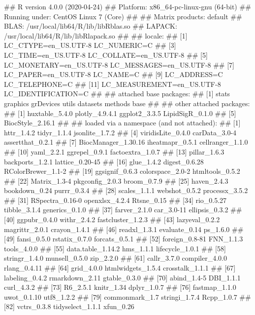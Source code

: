 \documentclass[]{article}
\renewenvironment{verbatim}{\color{codecolor}\begin{myshaded}\begin{oldverbatim}}{\end{oldverbatim}\end{myshaded}}
\begin{document}
\begin{verbatim}
## R version 4.0.0 (2020-04-24)
## Platform: x86_64-pc-linux-gnu (64-bit)
## Running under: CentOS Linux 7 (Core)
##
## Matrix products: default
## BLAS:   /usr/local/lib64/R/lib/libRblas.so
## LAPACK: /usr/local/lib64/R/lib/libRlapack.so
##
## locale:
##  [1] LC_CTYPE=en_US.UTF-8       LC_NUMERIC=C
##  [3] LC_TIME=en_US.UTF-8        LC_COLLATE=en_US.UTF-8
##  [5] LC_MONETARY=en_US.UTF-8    LC_MESSAGES=en_US.UTF-8
##  [7] LC_PAPER=en_US.UTF-8       LC_NAME=C
##  [9] LC_ADDRESS=C               LC_TELEPHONE=C
## [11] LC_MEASUREMENT=en_US.UTF-8 LC_IDENTIFICATION=C
##
## attached base packages:
## [1] stats     graphics  grDevices utils     datasets  methods   base
##
## other attached packages:
## [1] huxtable_5.4.0   plotly_4.9.4.1   ggplot2_3.3.5    LipidSigR_0.1.0
## [5] BiocStyle_2.16.1
##
## loaded via a namespace (and not attached):
##  [1] httr_1.4.2          tidyr_1.1.4         jsonlite_1.7.2
##  [4] viridisLite_0.4.0   carData_3.0-4       assertthat_0.2.1
##  [7] BiocManager_1.30.16 iheatmapr_0.5.1     cellranger_1.1.0
## [10] yaml_2.2.1          ggrepel_0.9.1       factoextra_1.0.7
## [13] pillar_1.6.3        backports_1.2.1     lattice_0.20-45
## [16] glue_1.4.2          digest_0.6.28       RColorBrewer_1.1-2
## [19] ggsignif_0.6.3      colorspace_2.0-2    htmltools_0.5.2
## [22] Matrix_1.3-4        pkgconfig_2.0.3     broom_0.7.9
## [25] haven_2.4.3         bookdown_0.24       purrr_0.3.4
## [28] scales_1.1.1        webshot_0.5.2       processx_3.5.2
## [31] RSpectra_0.16-0     openxlsx_4.2.4      Rtsne_0.15
## [34] rio_0.5.27          tibble_3.1.4        generics_0.1.0
## [37] farver_2.1.0        car_3.0-11          ellipsis_0.3.2
## [40] ggpubr_0.4.0        withr_2.4.2         fastcluster_1.2.3
## [43] lazyeval_0.2.2      magrittr_2.0.1      crayon_1.4.1
## [46] readxl_1.3.1        evaluate_0.14       ps_1.6.0
## [49] fansi_0.5.0         rstatix_0.7.0       forcats_0.5.1
## [52] foreign_0.8-81      FNN_1.1.3           tools_4.0.0
## [55] data.table_1.14.2   hms_1.1.1           lifecycle_1.0.1
## [58] stringr_1.4.0       munsell_0.5.0       zip_2.2.0
## [61] callr_3.7.0         compiler_4.0.0      rlang_0.4.11
## [64] grid_4.0.0          htmlwidgets_1.5.4   crosstalk_1.1.1
## [67] labeling_0.4.2      rmarkdown_2.11      gtable_0.3.0
## [70] abind_1.4-5         DBI_1.1.1           curl_4.3.2
## [73] R6_2.5.1            knitr_1.34          dplyr_1.0.7
## [76] fastmap_1.1.0       uwot_0.1.10         utf8_1.2.2
## [79] commonmark_1.7      stringi_1.7.4       Rcpp_1.0.7
## [82] vctrs_0.3.8         tidyselect_1.1.1    xfun_0.26
\end{verbatim}
\end{document}
